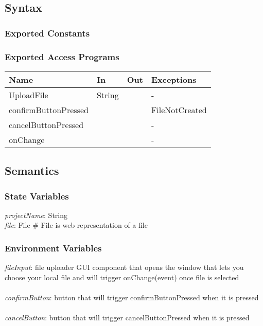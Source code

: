 \documentclass[12pt, titlepage]{article}
\begin{document}
	\subsection{Syntax}
	
	\subsubsection{Exported Constants}
	
	\subsubsection{Exported Access Programs}
	
	\begin{center}
		\begin{tabular}{p{2cm} p{4cm} p{4cm} p{2cm}}
			\hline
			\textbf{Name} & \textbf{In} & \textbf{Out} & \textbf{Exceptions} \\
			\hline
			UploadFile & String &  & - \\
			\hline
			confirmButtonPressed &  &  & FileNotCreated \\
			\hline
			cancelButtonPressed &  &  & - \\
			\hline
			onChange &  &  & - \\
			\hline
		\end{tabular}
	\end{center}
	
	\subsection{Semantics}
	
	\subsubsection{State Variables}
	\textit{projectName}: String\\
	\textit{file}: File \# File is web representation of a file
	
	
	\subsubsection{Environment Variables}
	
	\textit{fileInput}: file uploader GUI component that opens the window that lets you choose your local file and will trigger onChange(event) once file is selected \\\\
	\textit{confirmButton}: button that will trigger confirmButtonPressed when it is pressed \\\\ 
	\textit{cancelButton}: button that will trigger cancelButtonPressed when it is pressed \\\\ 
	
\end{document}
